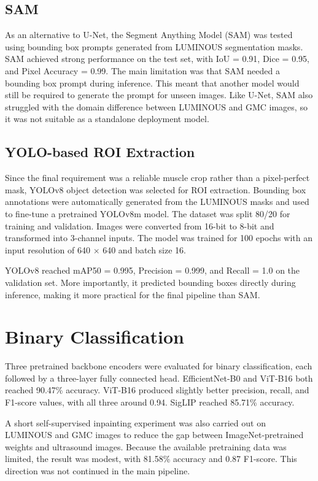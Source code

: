 \subsection{SAM}
As an alternative to U-Net, the Segment Anything Model (SAM) was tested using bounding box prompts generated from LUMINOUS segmentation masks. SAM achieved strong performance on the test set, with IoU = 0.91, Dice = 0.95, and Pixel Accuracy = 0.99. The main limitation was that SAM needed a bounding box prompt during inference. This meant that another model would still be required to generate the prompt for unseen images. Like U-Net, SAM also struggled with the domain difference between LUMINOUS and GMC images, so it was not suitable as a standalone deployment model.

\subsection{YOLO-based ROI Extraction}
Since the final requirement was a reliable muscle crop rather than a pixel-perfect mask, YOLOv8 object detection was selected for ROI extraction. Bounding box annotations were automatically generated from the LUMINOUS masks and used to fine-tune a pretrained YOLOv8m model. The dataset was split 80/20 for training and validation. Images were converted from 16-bit to 8-bit and transformed into 3-channel inputs. The model was trained for 100 epochs with an input resolution of 640 $\times$ 640 and batch size 16.

YOLOv8 reached mAP50 = 0.995, Precision = 0.999, and Recall = 1.0 on the validation set. More importantly, it predicted bounding boxes directly during inference, making it more practical for the final pipeline than SAM.

\section{Binary Classification}
Three pretrained backbone encoders were evaluated for binary classification, each followed by a three-layer fully connected head. EfficientNet-B0 and ViT-B16 both reached 90.47\% accuracy. ViT-B16 produced slightly better precision, recall, and F1-score values, with all three around 0.94. SigLIP reached 85.71\% accuracy.

A short self-supervised inpainting experiment was also carried out on LUMINOUS and GMC images to reduce the gap between ImageNet-pretrained weights and ultrasound images. Because the available pretraining data was limited, the result was modest, with 81.58\% accuracy and 0.87 F1-score. This direction was not continued in the main pipeline.

